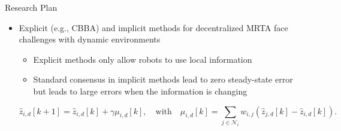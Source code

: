 \begin{frame}{Research Plan}
    \begin{itemize}
        \item Explicit (e.g., CBBA) and implicit methods for decentralized MRTA face challenges with dynamic environments
        \begin{itemize}
            \item Explicit methods only allow robots to use local information 
            \pause
            \item Standard consensus in implicit methods lead to zero steady-state error but leads to large errors when the information is changing
        \end{itemize}     
        \begin{equation*}
            \label{standard method}
            \hat{z}_{i,d}[k+1] =  \hat{z}_{i,d}[k] + \gamma \mu_{i,d}[k],   \quad \text{with} \quad \mu_{i,d}[k] = \sum_{j \in \mathcal{N}_i} w_{i,j}\left(\hat{z}_{j,d}[k] - \hat{z}_{i,d}[k]\right).
        \end{equation*}
        \vspace{-0.6cm}
    \end{itemize}
\end{frame}

